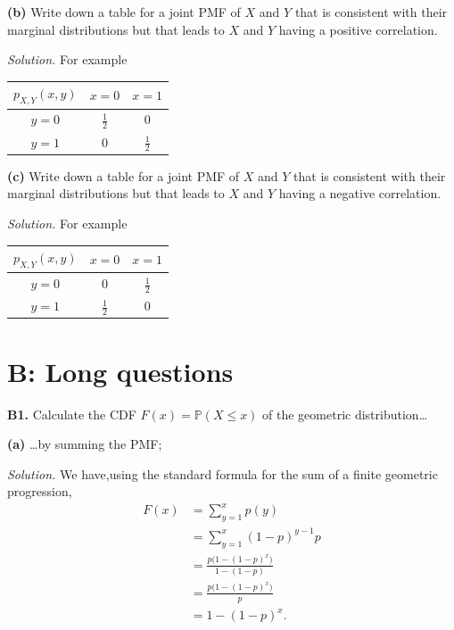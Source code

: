 \documentclass[
  a4paper,
]{book}
\theoremstyle{definition}
\theoremstyle{definition}
\theoremstyle{definition}
\theoremstyle{definition}
\theoremstyle{remark}
\begin{document}
\textbf{(b)} Write down a table for a joint PMF of \(X\) and \(Y\) that is consistent with their marginal distributions but that leads to \(X\) and \(Y\) having a positive correlation.

\begin{myanswers}

\emph{Solution.} For example

\begin{longtable}[]{@{}ccc@{}}
\toprule
\(p_{X,Y}(x,y)\) & \(x = 0\) & \(x = 1\) \\
\midrule
\endhead
\(y = 0\) & \(\frac12\) & \(0\) \\
\(y = 1\) & \(0\) & \(\frac12\) \\
\bottomrule
\end{longtable}

\end{myanswers}

\textbf{(c)} Write down a table for a joint PMF of \(X\) and \(Y\) that is consistent with their marginal distributions but that leads to \(X\) and \(Y\) having a negative correlation.

\begin{myanswers}

\emph{Solution.} For example

\begin{longtable}[]{@{}ccc@{}}
\toprule
\(p_{X,Y}(x,y)\) & \(x = 0\) & \(x = 1\) \\
\midrule
\endhead
\(y = 0\) & \(0\) & \(\frac12\) \\
\(y = 1\) & \(\frac12\) & \(0\) \\
\bottomrule
\end{longtable}

\end{myanswers}

\hypertarget{P4-long}{%
\section*{B: Long questions}\label{P4-long}}

\textbf{B1.} Calculate the CDF \(F(x) = \mathbb P(X \leq x)\) of the geometric distribution\ldots{}

\textbf{(a)} \ldots by summing the PMF;

\begin{myanswers}
\emph{Solution.}
We have,using the standard formula for the sum of a finite geometric progression,
\begin{align*}
F(x) &= \sum_{y = 1}^x p(y) \\
&= \sum_{y = 1}^x (1-p)^{y-1} p \\
&= \frac{p\big(1 - (1-p)^x\big)}{1 - (1-p)} \\
&= \frac{p\big(1 - (1-p)^x\big)}{p} \\
&= 1 - (1 - p)^x .
\end{align*}

\end{myanswers}
\end{document}
